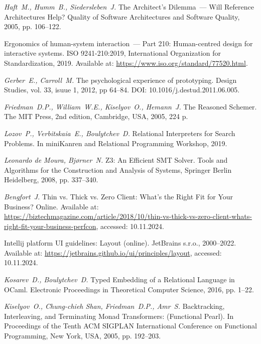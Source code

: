 {\em Haft~M., Humm~B., Siedersleben~J.} The Architect's Dilemma~--- Will Reference Architectures Help? Quality of Software Architectures and Software Quality, 2005, pp. 106--122.



Ergonomics of human-system interaction~--- Part 210: Human-centred design for interactive
systems. ISO 9241-210:2019, International Organization for Standardization, 2019. Available at: \url{https://www.iso.org/standard/77520.html}.

{\em Gerber~E., Carroll~M.} The psychological experience of prototyping. Design Studies, vol. 33, isuue 1, 2012, pp 64--84. DOI: 10.1016/j.destud.2011.06.005.

{\em Friedman~D.P., William~W.E., Kiselyov~O., Hemann~J.} The Reasoned Schemer. The MIT Press, 2nd edition, Cambridge, USA, 2005, 224 p.

{\em Lozov~P., Verbitskaia~E., Boulytchev~D.} Relational Interpreters for Search Problems. In miniKanren and Relational Programming Workshop, 2019.

{\em Leonardo de Moura, Bj{\o}rner~N.} Z3: An Efficient SMT Solver. Tools and Algorithms for the Construction and Analysis of Systems, Springer Berlin Heidelberg, 2008, pp. 337--340.

{\em Bengfort~J.} Thin vs. Thick vs. Zero Client: What's the Right Fit for Your Business? Online. Available at:
\url{https://biztechmagazine.com/article/2018/10/thin-vs-thick-vs-zero-client-whats-right-fit-your-business-perfcon}, accessed: 10.11.2024.

Intellij platform UI guidelines: Layout (online). JetBrains s.r.o., 2000--2022. Available at: \url{https://jetbrains.github.io/ui/principles/layout}, accessed: 10.11.2024.

{\em Kosarev~D., Boulytchev~D.} Typed Embedding of a Relational Language in OCaml. Electronic Proceedings in Theoretical Computer Science, 2016, pp. 1--22.

{\em Kiselyov~O., Chung-chieh Shan, Friedman~D.P., Amr~S.} Backtracking, Interleaving, and Terminating Monad Transformers: (Functional Pearl). In Proceedings of the Tenth ACM SIGPLAN International Conference on Functional Programming, New York, USA, 2005, pp. 192--203.


